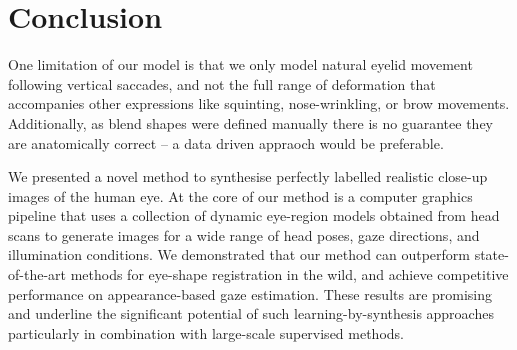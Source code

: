 
\section{Conclusion}

One limitation of our model is that we only model natural eyelid movement following vertical saccades, and not the full range of deformation that accompanies other expressions like squinting, nose-wrinkling, or brow movements.
Additionally, as blend shapes were defined manually there is no guarantee they are anatomically correct -- a data driven appraoch would be preferable. 

We presented a novel method to synthesise perfectly labelled realistic close-up images of the human eye.
At the core of our method is a computer graphics pipeline that uses a collection of dynamic eye-region models obtained from head scans to generate images for a wide range of head poses, gaze directions, and illumination conditions.
We demonstrated that our method can outperform state-of-the-art methods for eye-shape registration in the wild, and achieve competitive performance on appearance-based gaze estimation.
These results are promising and underline the significant potential of such learning-by-synthesis approaches particularly in combination with large-scale supervised methods.